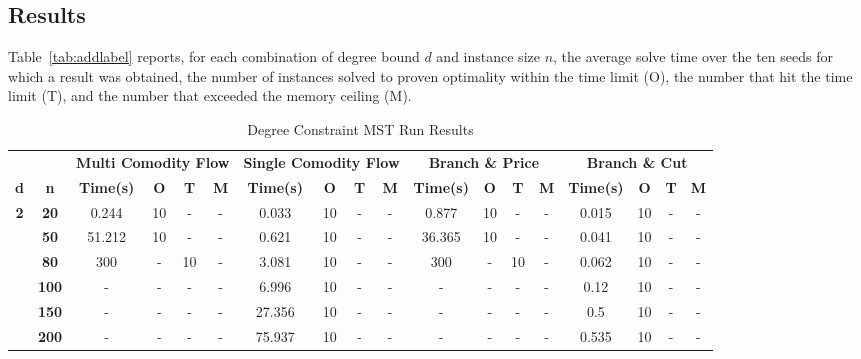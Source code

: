 \documentclass[12pt]{article}
\begin{document}
\subsection{Results}

Table~\ref{tab:addlabel} reports, for each combination of degree bound $d$ and instance size $n$, the average solve time over the ten seeds for which a result was obtained, the number of instances solved to proven optimality within the time limit (O), the number that hit the time limit (T), and the number that exceeded the memory ceiling (M).

\begin{table}[h]
\scriptsize
\setlength{\tabcolsep}{5pt}
  \centering
  \caption{Degree Constraint MST Run Results}
    \begin{tabular}{cccccccccccccccccc}
    \toprule
    \multicolumn{1}{c}{} &       & \multicolumn{4}{c}{\textbf{Multi Comodity Flow}} & \multicolumn{4}{c}{\textbf{Single Comodity Flow}} & \multicolumn{4}{c}{\textbf{Branch \& Price}} & \multicolumn{4}{c}{\textbf{Branch \& Cut}} \\
    \cmidrule(l{3pt}r{3pt}){3-6} \cmidrule(l{3pt}r{3pt}){7-10} \cmidrule(l{3pt}r{3pt}){11-14} \cmidrule(l{3pt}r{3pt}){15-18}
    \multicolumn{1}{c}{\textbf{d}} & \textbf{n} & \textbf{ Time(s)} & \textbf{O} & \textbf{T} & \textbf{M} & \textbf{ Time(s)} & \textbf{O} & \textbf{T} & \textbf{M} & \textbf{ Time(s)} & \textbf{O} & \textbf{T} & \textbf{M} & \textbf{ Time(s)} & \textbf{O} & \textbf{T} & \multicolumn{1}{c}{\textbf{M}} \\
    \midrule
    \multirow{15}[2]{*}{\textbf{2}} & \textbf{20} & 0.244 & 10    & -     & -     & 0.033 & 10    & -     & -     & 0.877 & 10    & -     & -     & 0.015 & 10    & -     & - \\
          & \textbf{50} & 51.212 & 10    & -     & -     & 0.621 & 10    & -     & -     & 36.365 & 10    & -     & -     & 0.041 & 10    & -     & - \\
          & \textbf{80} & 300   & -     & 10    & -     & 3.081 & 10    & -     & -     & 300   & -     & 10    & -     & 0.062 & 10    & -     & - \\
          & \textbf{100} & -     & -     & -     & -     & 6.996 & 10    & -     & -     & -     & -     & -     & -     & 0.12  & 10    & -     & - \\
          & \textbf{150} & -     & -     & -     & -     & 27.356 & 10    & -     & -     & -     & -     & -     & -     & 0.5   & 10    & -     & - \\
          & \textbf{200} & -     & -     & -     & -     & 75.937 & 10    & -     & -     & -     & -     & -     & -     & 0.535 & 10    & -     & - \\

\end{tabular}
\end{table}
\end{document}
